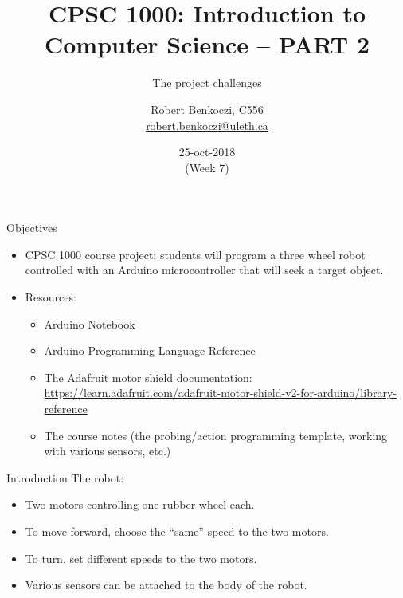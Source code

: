 \documentclass[aspectratio=1610]{beamer}
\title %
{CPSC 1000: Introduction to Computer Science -- PART 2}
\subtitle{The project challenges} %
\author{Robert Benkoczi, C556\\\url{robert.benkoczi@uleth.ca}}
\date{25-oct-2018\\(Week 7)}
\begin{document}
\begin{frame}[plain]
\titlepage
\end{frame}


\begin{frame}[t,plain]{Objectives}
\begin{itemize}
\item CPSC 1000 course project: students will program a three wheel
  robot controlled with an Arduino microcontroller that will seek a
  target object.
\item  Resources: 
\begin{itemize}
\item Arduino Notebook 
\item Arduino Programming Language
  Reference
\item The Adafruit motor shield documentation: 
\url{https://learn.adafruit.com/adafruit-motor-shield-v2-for-arduino/library-reference}
\item The course notes (the probing/action programming template,
  working with various sensors, etc.)
\end{itemize}
\end{itemize}
\end{frame}


\begin{frame}{Introduction}
The robot:

\begin{itemize}
\item Two motors controlling one rubber wheel each.
\item To move forward, choose the ``same'' speed to the two motors.
\item To turn, set different speeds to the two motors.
\item Various sensors can be attached to the body of the robot.
\end{itemize}

\end{frame}

\end{document}
